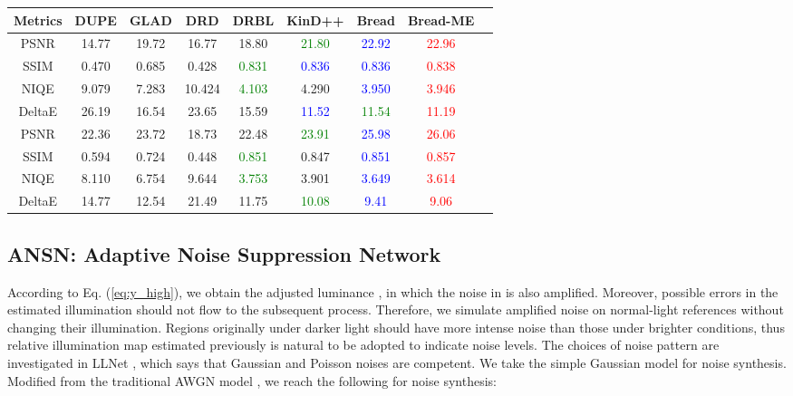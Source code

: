 \documentclass[10pt,twocolumn,letterpaper]{article}
\begin{document}
\begin{table*}[t]
\begin{tabular}{ccccccccc}
    Metrics & DUPE \cite{wang2019underexposed}& GLAD \cite{wang2018gladnet}& DRD \cite{DBLP:conf/bmvc/WeiWY018}& DRBL  \cite{yang2020fidelity}& KinD++ \cite{zhang2021beyond} & Bread & Bread-ME \\ \hline
    PSNR & 14.77 & 19.72 & 16.77 & 18.80 & \textcolor{green}{21.80}  & \textcolor{blue}{22.92} & \textcolor{red}{22.96} \\
    SSIM & 0.470 & 0.685 & 0.428 & \textcolor{green}{0.831} & \textcolor{blue}{0.836} & \textcolor{blue}{0.836} & \textcolor{red}{0.838} \\
    NIQE & 9.079 & 7.283 & 10.424 & \textcolor{green}{4.103} & 4.290 & \textcolor{blue}{3.950} & \textcolor{red}{3.946} \\
    DeltaE & 26.19 & 16.54 & 23.65 & 15.59  & \textcolor{blue}{11.52} & \textcolor{green}{11.54} & \textcolor{red}{11.19}  \\
    PSNR & 22.36 & 23.72 & 18.73 & 22.48 & \textcolor{green}{23.91} & \textcolor{blue}{25.98} & \textcolor{red}{26.06} \\
    SSIM & 0.594 & 0.724 & 0.448 & \textcolor{green}{0.851} & 0.847 & \textcolor{blue}{0.851} & \textcolor{red}{0.857} \\
    NIQE & 8.110 & 6.754 & 9.644 & \textcolor{green}{3.753}  & 3.901 & \textcolor{blue}{3.649} & \textcolor{red}{3.614} \\
    DeltaE & 14.77 & 12.54 & 21.49 & 11.75 & \textcolor{green}{10.08} & \textcolor{blue}{9.41} & \textcolor{red}{9.06}  \\
    \bottomrule[1pt]
    \end{tabular}




       
\end{table*}


\subsection{ANSN: Adaptive Noise Suppression Network}
\label{sec:noise_suppression}
According to Eq. (\ref{eq:y_high}), we obtain the adjusted luminance , in which the noise in  is also amplified. Moreover, possible errors in the estimated illumination should not flow to the subsequent process. Therefore, we simulate amplified noise  on normal-light references  without changing their illumination. Regions originally under darker light should have more intense noise than those under brighter conditions, thus relative illumination map  estimated previously is natural to be adopted to indicate noise levels. The choices of noise pattern are investigated in LLNet \cite{lore2017llnet}, which says that Gaussian and Poisson noises are competent. We take the simple Gaussian model for noise synthesis. Modified from the traditional AWGN model \cite{zhang2017beyond}, we reach the following for noise synthesis: 
\end{document}
